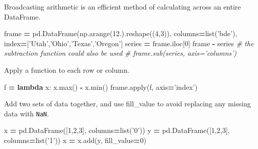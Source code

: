 \documentclass[]{book}
\newenvironment{Shaded}{\begin{snugshade}}{\end{snugshade}}
\newcommand{\KeywordTok}[1]{\textcolor[rgb]{0.13,0.29,0.53}{\textbf{#1}}}
\newcommand{\DecValTok}[1]{\textcolor[rgb]{0.00,0.00,0.81}{#1}}
\newcommand{\StringTok}[1]{\textcolor[rgb]{0.31,0.60,0.02}{#1}}
\newcommand{\CommentTok}[1]{\textcolor[rgb]{0.56,0.35,0.01}{\textit{#1}}}
\newcommand{\OperatorTok}[1]{\textcolor[rgb]{0.81,0.36,0.00}{\textbf{#1}}}
\newcommand{\BuiltInTok}[1]{#1}
\newcommand{\NormalTok}[1]{#1}
\begin{document}
Broadcasting arithmetic is an efficient method of calculating across an
entire DataFrame.

\begin{Shaded}
\begin{Highlighting}[]
\NormalTok{frame }\OperatorTok{=}\NormalTok{ pd.DataFrame(np.arange(}\DecValTok{12}\NormalTok{.).reshape((}\DecValTok{4}\NormalTok{,}\DecValTok{3}\NormalTok{)), columns}\OperatorTok{=}\BuiltInTok{list}\NormalTok{(}\StringTok{'bde'}\NormalTok{), index}\OperatorTok{=}\NormalTok{[}\StringTok{'Utah'}\NormalTok{,}\StringTok{'Ohio'}\NormalTok{,}\StringTok{'Texas'}\NormalTok{,}\StringTok{'Oregon'}\NormalTok{]}
\NormalTok{series }\OperatorTok{=}\NormalTok{ frame.iloc[}\DecValTok{0}\NormalTok{]}
\NormalTok{frame }\OperatorTok{-}\NormalTok{ series}
\CommentTok{# the subtraction function could also be used}
\CommentTok{# frame.sub(series, axis='columns')}
\end{Highlighting}
\end{Shaded}

Apply a function to each row or column.

\begin{Shaded}
\begin{Highlighting}[]
\NormalTok{f }\OperatorTok{=} \KeywordTok{lambda}\NormalTok{ x: x.}\BuiltInTok{max}\NormalTok{() }\OperatorTok{-}\NormalTok{ x.}\BuiltInTok{min}\NormalTok{()}
\NormalTok{frame.}\BuiltInTok{apply}\NormalTok{(f, axis}\OperatorTok{=}\StringTok{'index'}\NormalTok{)}
\end{Highlighting}
\end{Shaded}

Add two sets of data together, and use fill\_value to avoid replacing
any missing data with \texttt{NaN}.

\begin{Shaded}
\begin{Highlighting}[]
\NormalTok{x }\OperatorTok{=}\NormalTok{ pd.DataFrame([}\DecValTok{1}\NormalTok{,}\DecValTok{2}\NormalTok{,}\DecValTok{3}\NormalTok{], columns}\OperatorTok{=}\BuiltInTok{list}\NormalTok{(}\StringTok{'0'}\NormalTok{))    }
\NormalTok{y }\OperatorTok{=}\NormalTok{ pd.DataFrame([}\DecValTok{1}\NormalTok{,}\DecValTok{2}\NormalTok{,}\DecValTok{3}\NormalTok{], columns}\OperatorTok{=}\BuiltInTok{list}\NormalTok{(}\StringTok{'1'}\NormalTok{))}
\NormalTok{x }\OperatorTok{=}\NormalTok{ x.add(y, fill_value}\OperatorTok{=}\DecValTok{0}\NormalTok{)}
\end{Highlighting}
\end{Shaded}
\end{document}
